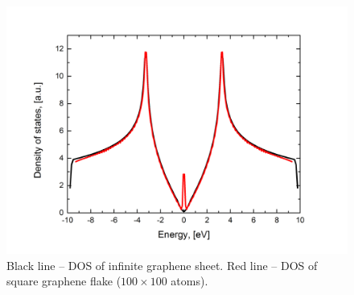 \begin{figure}[h] 
\begin{center}
  \includegraphics[width=0.8\linewidth]{img/zz_chain_25_50_dos}
  \caption{Black line -- DOS of infinite graphene sheet. Red line -- DOS of square graphene flake ($100 \times 100$ atoms). \label{fig:2d_dos}}
\end{center}
\end{figure}
